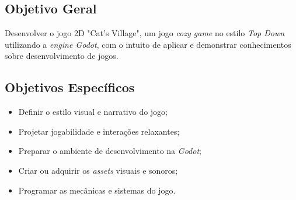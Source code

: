 \subsection{Objetivo Geral}

Desenvolver o jogo 2D "Cat's Village", um jogo \textit{cozy game} no estilo \textit{Top Down} utilizando a \textit{engine Godot}, com o intuito de aplicar e demonstrar conhecimentos sobre desenvolvimento de jogos.

\subsection{Objetivos Específicos}
\begin{itemize}
	\item Definir o estilo visual e narrativo do jogo;
	\item Projetar jogabilidade e interações relaxantes;
	\item Preparar o ambiente de desenvolvimento na \textit{Godot};
	\item Criar ou adquirir os \textit{assets} visuais e sonoros;
	\item Programar as mecânicas e sistemas do jogo.
	
\end{itemize}